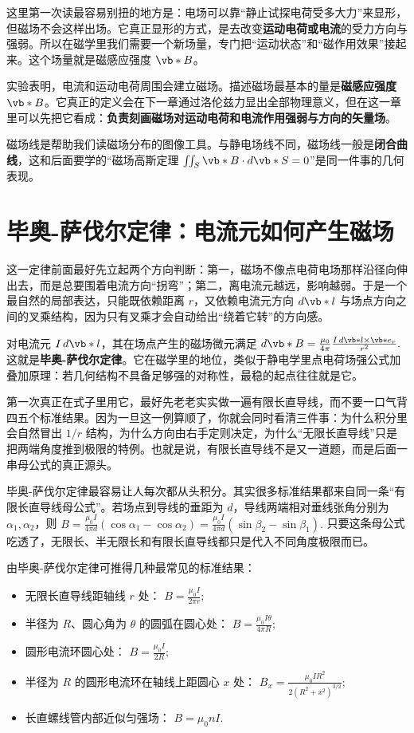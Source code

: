 \documentclass[lang=cn,11pt]{elegantbook}
\newcommand{\bridge}[1]{\begin{note}#1\end{note}}
\begin{document}
这里第一次读最容易别扭的地方是：电场可以靠“静止试探电荷受多大力”来显形，但磁场不会这样出场。它真正显形的方式，是去改变\textbf{运动电荷或电流}的受力方向与强弱。所以在磁学里我们需要一个新场量，专门把“运动状态”和“磁作用效果”接起来。这个场量就是磁感应强度 \(\vb*{B}\)。

实验表明，电流和运动电荷周围会建立磁场。描述磁场最基本的量是\textbf{磁感应强度} \(\vb*{B}\)。它真正的定义会在下一章通过洛伦兹力显出全部物理意义，但在这一章里可以先把它看成：\textbf{负责刻画磁场对运动电荷和电流作用强弱与方向的矢量场}。

磁场线是帮助我们读磁场分布的图像工具。与静电场线不同，磁场线一般是\textbf{闭合曲线}，这和后面要学的“磁场高斯定理 \(\iint_S \vb*{B}\cdot d\vb*{S}=0\)”是同一件事的几何表现。

\section{毕奥-萨伐尔定律：电流元如何产生磁场}

这一定律前面最好先立起两个方向判断：第一，磁场不像点电荷电场那样沿径向伸出去，而是总要围着电流方向“拐弯”；第二，离电流元越远，影响越弱。于是一个最自然的局部表达，只能既依赖距离 \(r\)，又依赖电流元方向 \(d\vb*{l}\) 与场点方向之间的叉乘结构，因为只有叉乘才会自动给出“绕着它转”的方向感。

对电流元 \(I\,d\vb*{l}\)，其在场点产生的磁场微元满足
 \(d\vb*{B} =\frac{\mu_0}{4\pi}\frac{I\,d\vb*{l}\times \vb*{e}_r}{r^2}.\) 
这就是\textbf{毕奥-萨伐尔定律}。它在磁学里的地位，类似于静电学里点电荷场强公式加叠加原理：若几何结构不具备足够强的对称性，最稳的起点往往就是它。

第一次真正在式子里用它，最好先老老实实做一遍有限长直导线，而不要一口气背四五个标准结果。因为一旦这一例算顺了，你就会同时看清三件事：为什么积分里会自然冒出 \(1/r\) 结构，为什么方向由右手定则决定，为什么“无限长直导线”只是把两端角度推到极限的特例。也就是说，有限长直导线不是又一道题，而是后面一串母公式的真正源头。

\bridge{毕奥-萨伐尔定律最容易让人每次都从头积分。其实很多标准结果都来自同一条“有限长直导线母公式”。若场点到导线的垂距为 \(d\)，导线两端相对垂线张角分别为 \(\alpha_1,\alpha_2\)，则
 \(B=\frac{\mu_0 I}{4\pi d}(\cos\alpha_1-\cos\alpha_2) =\frac{\mu_0 I}{4\pi d}(\sin\beta_2-\sin\beta_1).\) 
只要这条母公式吃透了，无限长、半无限长和有限长直导线都只是代入不同角度极限而已。}

由毕奥-萨伐尔定律可推得几种最常见的标准结果：
\begin{itemize}
 \item 无限长直导线距轴线 \(r\) 处：
 \(B=\frac{\mu_0 I}{2\pi r};\) 
 \item 半径为 \(R\)、圆心角为 \(\theta\) 的圆弧在圆心处：
 \(B=\frac{\mu_0 I\theta}{4\pi R};\) 
 \item 圆形电流环圆心处：
 \(B=\frac{\mu_0 I}{2R};\) 
 \item 半径为 \(R\) 的圆形电流环在轴线上距圆心 \(x\) 处：
 \(B_x=\frac{\mu_0 I R^2}{2(R^2+x^2)^{3/2}};\) 
 \item 长直螺线管内部近似匀强场：
 \(B=\mu_0 n I.\) 
\end{itemize}
\end{document}

